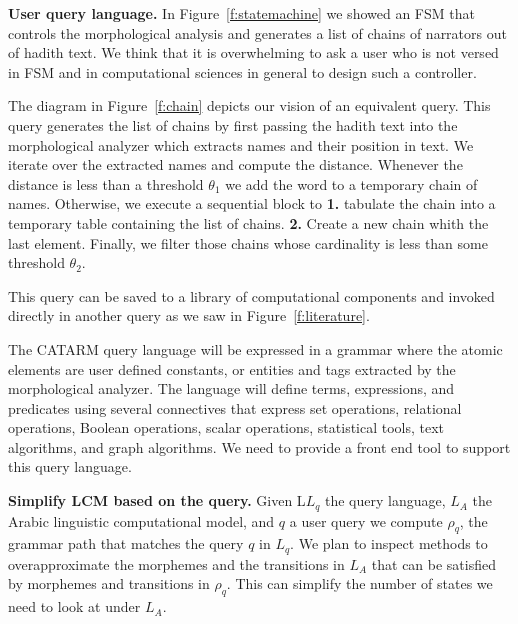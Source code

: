 \documentclass[12pt]{article}
\begin{document}
{\bf User query language. }
In Figure~\ref{f:statemachine} we showed an FSM 
that controls the morphological analysis and generates a
list of chains of narrators out of hadith text.
We think that it is overwhelming to ask a user who is not 
versed in FSM and in computational sciences in general 
to design such a controller. 

The diagram in Figure~\ref{f:chain} depicts our vision of 
an equivalent query.
This query generates the list of chains by first passing the 
hadith text into the morphological analyzer which 
extracts names and their position in text. 
We iterate over the extracted names and compute the distance.
Whenever the distance is less than a threshold $\theta_1$
we add the word to a temporary chain of names. 
Otherwise, we execute a sequential block to 
{\bf 1.} tabulate the chain into a temporary table containing 
the list of chains. 
{\bf 2.} Create a new chain whith the last element.
Finally, we filter those chains whose cardinality 
is less than some threshold  $\theta_2$.

This query can be saved to a library of computational components
and invoked directly in another query 
as we saw in Figure~\ref{f:literature}.

\begin{figure}
\end{figure}

The CATARM query language will be expressed in a grammar 
where the atomic elements are user defined constants, or
entities and tags extracted by the morphological analyzer. 
The language will define terms, expressions, and predicates
using several connectives that express set operations, 
relational operations, Boolean operations, scalar operations, 
statistical tools, text algorithms, and graph algorithms. 
We need to provide a front end tool to support this query
language.

{\bf Simplify LCM based on the query.}
Given
L$L_q$ the query language, 
$L_A$ the Arabic linguistic
computational model, and  $q$ a user query
we compute $\rho_q$, the grammar path that matches 
the query $q$ in $L_q$. 
We plan to inspect methods to overapproximate 
the morphemes and the transitions in $L_A$ 
that can be satisfied by morphemes and transitions
in $\rho_q$. 
This can simplify the number of states we need to 
look at under $L_A$. 
\end{document}
